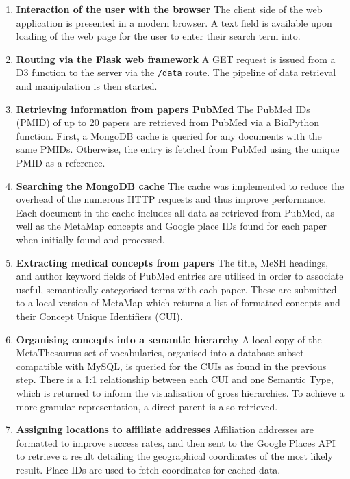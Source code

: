 \documentclass[Report.tex]{subfiles}
\begin{document}
\begin{enumerate}
\item{\textbf{Interaction of the user with the browser}} 
\newline The client side of the web application is presented in a modern browser. A text field is available upon loading of the web page for the user to enter their search term into.
\item{\textbf{Routing via the Flask web framework}}
\newline A GET request is issued from a D3 function to the server via the \texttt{/data} route. The pipeline of data retrieval and manipulation is then started.
\item{\textbf{Retrieving information from papers PubMed}}
\newline The PubMed IDs (PMID) of up to 20 papers are retrieved from PubMed via a BioPython function\cite{biopython}. First, a MongoDB cache is queried for any documents with the same PMIDs. Otherwise, the entry is fetched from PubMed using the unique PMID as a reference.
\item{\textbf{Searching the MongoDB cache}}
\newline The cache was implemented to reduce the overhead of the numerous HTTP requests and thus improve performance. Each document in the cache includes all data as retrieved from PubMed, as well as the MetaMap concepts and Google place IDs found for each paper when initially found and processed.
\item{\textbf{Extracting medical concepts from papers}}
\newline The title, MeSH headings, and author keyword fields of PubMed entries are utilised in order to associate useful, semantically categorised terms with each paper. These are submitted to a local version of MetaMap which returns a list of formatted concepts and their Concept Unique Identifiers (CUI).
\item{\textbf{Organising concepts into a semantic hierarchy}}
\newline A local copy of the MetaThesaurus set of vocabularies, organised into a database subset compatible with MySQL, is queried for the CUIs as found in the previous step. There is a 1:1 relationship between each CUI and one Semantic Type, which is returned to inform the visualisation of gross hierarchies. To achieve a more granular representation, a direct parent is also retrieved.
\item{\textbf{Assigning locations to affiliate addresses}}
\newline Affiliation addresses are formatted to improve success rates, and then sent to the Google Places API to retrieve a result detailing the geographical coordinates of the most likely result. Place IDs are used to fetch coordinates for cached data.

\end{enumerate}
\end{document}
